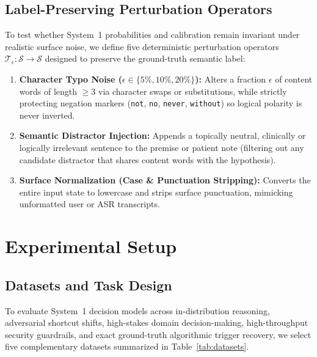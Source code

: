 \documentclass[10pt]{article}
\begin{document}
\subsection{Label-Preserving Perturbation Operators}
To test whether System~1 probabilities and calibration remain invariant under realistic surface noise, we define five deterministic perturbation operators $\mathcal{T}_\epsilon: \mathcal{S} \to \mathcal{S}$ designed to preserve the ground-truth semantic label:
\begin{enumerate}
\item \textbf{Character Typo Noise ($\epsilon \in \{5\%, 10\%, 20\%\}$):} Alters a fraction $\epsilon$ of content words of length $\ge 3$ via character swaps or substitutions, while strictly protecting negation markers (\texttt{not}, \texttt{no}, \texttt{never}, \texttt{without}) so logical polarity is never inverted.
\item \textbf{Semantic Distractor Injection:} Appends a topically neutral, clinically or logically irrelevant sentence to the premise or patient note (filtering out any candidate distractor that shares content words with the hypothesis).
\item \textbf{Surface Normalization (Case \& Punctuation Stripping):} Converts the entire input state to lowercase and strips surface punctuation, mimicking unformatted user or ASR transcripts.
\end{enumerate}

\section{Experimental Setup}
\label{sec:setup}

\subsection{Datasets and Task Design}
To evaluate System~1 decision models across in-distribution reasoning, adversarial shortcut shifts, high-stakes domain decision-making, high-throughput security guardrails, and exact ground-truth algorithmic trigger recovery, we select five complementary datasets summarized in Table~\ref{tab:datasets}.
\end{document}
